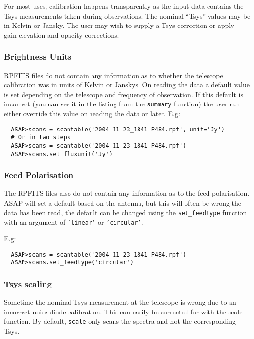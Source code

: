 \documentclass[11pt]{article}
\newcommand{\cmd}[1]{{\tt #1}}
\begin{document}
For most uses, calibration happens transparently as the input data
contains the Tsys measurements taken during observations. The nominal
``Tsys'' values may be in Kelvin or Jansky. The user may wish to
supply a Tsys correction or apply gain-elevation and opacity
corrections.

\subsubsection{Brightness Units}

RPFITS files do not contain any information as
to whether the telescope calibration was in units of Kelvin or
Janskys.  On reading the data a default value is set depending on the
telescope and frequency of observation.  If this default is incorrect
(you can see it in the listing from the \cmd{summary} function) the
user can either override this value on reading the data or later.
E.g:

\begin{verbatim}
  ASAP>scans = scantable('2004-11-23_1841-P484.rpf', unit='Jy')
  # Or in two steps
  ASAP>scans = scantable('2004-11-23_1841-P484.rpf')
  ASAP>scans.set_fluxunit('Jy')
\end{verbatim}

\subsubsection{Feed Polarisation}

The RPFITS files also do not contain any
information as to the feed polarisation. ASAP will set a default based
on the antenna, but this will often be wrong the data has been read,
the default can be changed using the \cmd{set\_feedtype} function with
an argument of \cmd{'linear'} or \cmd{'circular'}.

E.g:

\begin{verbatim}
  ASAP>scans = scantable('2004-11-23_1841-P484.rpf')
  ASAP>scans.set_feedtype('circular')
\end{verbatim}

\subsubsection{Tsys scaling}

Sometime the nominal Tsys measurement at the
telescope is wrong due to an incorrect noise diode calibration. This
can easily be corrected for with the scale function. By default,
\cmd{scale} only scans the spectra and not the corresponding Tsys.
\end{document}
